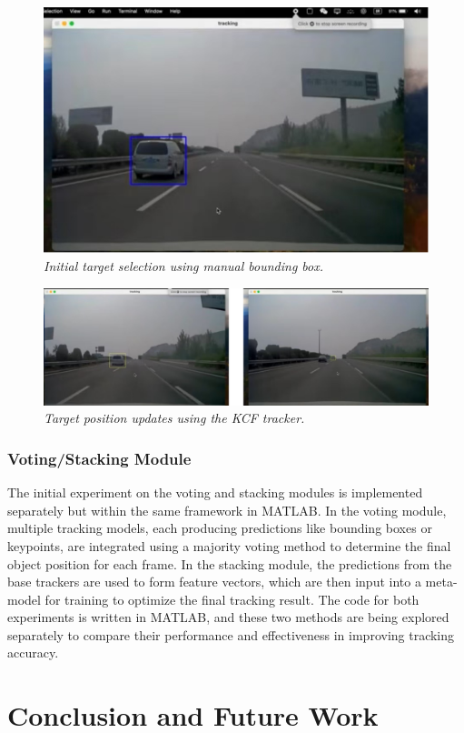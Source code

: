 \documentclass[11pt, letterpaper]{article}
\begin{document}
\begin{figure}
  \centering
  \includegraphics[width=0.5\linewidth]{img/kcf-target-selection.png}
  \caption{\label{fig:kcf_select}\textit{Initial target selection using manual bounding box.}}
\end{figure}
\begin{figure}
  \centering
  \includegraphics[width=1\linewidth]{img/kcf-position-updates.png}
  \caption{\label{fig:kcf_updates}\textit{Target position updates using the KCF tracker.}}
\end{figure}

\subsubsection{Voting/Stacking Module}

The initial experiment on the voting and stacking modules is implemented separately but within the same framework in MATLAB. In the voting module, multiple tracking models, each producing predictions like bounding boxes or keypoints, are integrated using a majority voting method to determine the final object position for each frame. In the stacking module, the predictions from the base trackers are used to form feature vectors, which are then input into a meta-model for training to optimize the final tracking result. The code for both experiments is written in MATLAB, and these two methods are being explored separately to compare their performance and effectiveness in improving tracking accuracy.


\section{Conclusion and Future Work}
\end{document}
